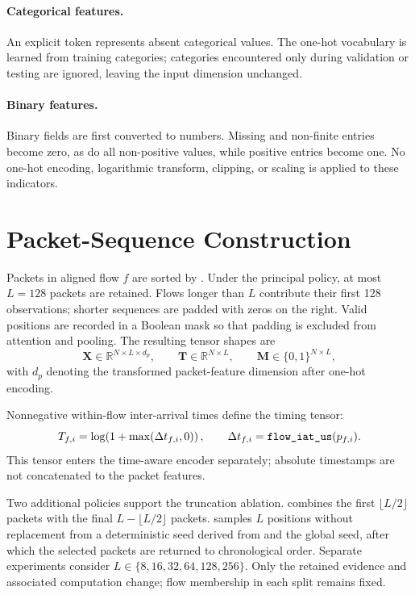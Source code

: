 \documentclass[11pt,fleqn]{report}
\begin{document}
\paragraph{Categorical features.}
An explicit  token represents absent categorical values. The one-hot vocabulary is learned from training categories; categories encountered only during validation or testing are ignored, leaving the input dimension unchanged.

\paragraph{Binary features.}
Binary fields are first converted to numbers. Missing and non-finite entries become zero, as do all non-positive values, while positive entries become one. No one-hot encoding, logarithmic transform, clipping, or scaling is applied to these indicators.

\section{Packet-Sequence Construction}
\label{subsec:sequence_construction}

Packets in aligned flow $f$ are sorted by . Under the principal  policy, at most $L=128$ packets are retained. Flows longer than $L$ contribute their first 128 observations; shorter sequences are padded with zeros on the right. Valid positions are recorded in a Boolean mask so that padding is excluded from attention and pooling. The resulting tensor shapes are
\begin{equation}
    \mathbf{X}\in\mathbb{R}^{N\times L\times d_p},\qquad
    \mathbf{T}\in\mathbb{R}^{N\times L},\qquad
    \mathbf{M}\in\{0,1\}^{N\times L},
    \label{eq:stage1_tensor_shapes}
\end{equation}
with $d_p$ denoting the transformed packet-feature dimension after one-hot encoding.

Nonnegative within-flow inter-arrival times define the timing tensor:
\begin{equation}
    T_{f,i}=\log\!\left(1+\max(\Delta t_{f,i},0)\right),
    \qquad
    \Delta t_{f,i}=\datasetfield{flow_iat_us}(p_{f,i}).
    \label{eq:time_tensor}
\end{equation}
This tensor enters the time-aware encoder separately; absolute timestamps are not concatenated to the packet features.

Two additional policies support the truncation ablation.  combines the first $\lfloor L/2\rfloor$ packets with the final $L-\lfloor L/2\rfloor$ packets.  samples $L$ positions without replacement from a deterministic seed derived from  and the global seed, after which the selected packets are returned to chronological order. Separate experiments consider $L\in\{8,16,32,64,128,256\}$. Only the retained evidence and associated computation change; flow membership in each split remains fixed.
\end{document}
